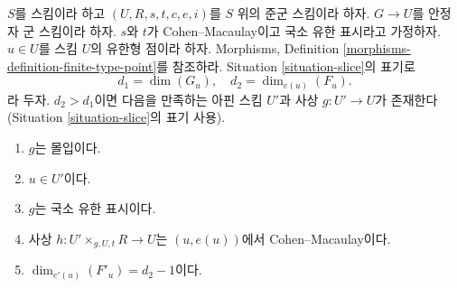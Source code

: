 \begin{lemma}
\label{lemma-slice}
$S$를 스킴이라 하고 $(U, R, s, t, c, e, i)$를 $S$ 위의 준군 스킴이라 하자.
$G \to U$를 안정자 군 스킴이라 하자. $s$와 $t$가 Cohen--Macaulay이고
국소 유한 표시라고 가정하자. $u \in U$를 스킴 $U$의 유한형 점이라 하자.
Morphisms, Definition \ref{morphisms-definition-finite-type-point}를 참조하라.
Situation \ref{situation-slice}의 표기로
$$
d_1 = \dim(G_u), \quad
d_2 = \dim_{e(u)}(F_u).
$$
라 두자. $d_2 > d_1$이면 다음을 만족하는 아핀 스킴 $U'$과 사상
$g : U' \to U$가 존재한다(Situation \ref{situation-slice}의 표기 사용).
\begin{enumerate}
\item $g$는 몰입이다.
\item $u \in U'$이다.
\item $g$는 국소 유한 표시이다.
\item 사상 $h : U' \times_{g, U, t} R \longrightarrow U$는
$(u, e(u))$에서 Cohen--Macaulay이다.
\item $\dim_{e'(u)}(F'_u) = d_2 - 1$이다.
\end{enumerate}
\end{lemma}


